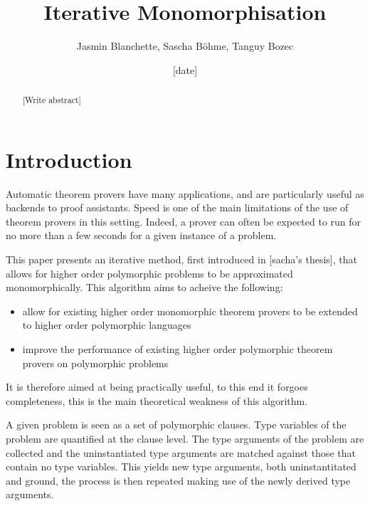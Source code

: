 \documentclass{article}
\begin{document}
\title{Iterative Monomorphisation}
\author{Jasmin Blanchette, Sascha B\"ohme, Tanguy Bozec}
\date{[date]}
\maketitle
\begin{abstract}
   [Write abstract]
\end{abstract}


\section{Introduction}
Automatic theorem provers have many applications, and are particularly useful as backends to proof assistants. Speed is one of the main limitations of the use of theorem provers in this setting. Indeed, a prover can often be expected to run for no more than a few seconds for a given instance of a problem.

This paper presents an iterative method, first introduced in [sacha's thesis], that allows for higher order polymorphic problems to be approximated monomorphically. This algorithm aims to acheive the following:
   \begin{itemize}
      \item allow for existing higher order monomorphic theorem provers to be extended to higher order polymorphic languages
      \item improve the performance of existing higher order polymorphic theorem provers on polymorphic problems
   \end{itemize}

It is therefore aimed at being practically useful, to this end it forgoes completeness, this is the main theoretical weakness of this algorithm.


A given problem is seen as a set of polymorphic clauses. Type variables of the problem are quantified at the clause level. The type arguments of the problem are collected and the uninstantiated type arguments are matched against those that contain no type variables. This yields new type arguments, both uninstantitated and ground, the process is then repeated making use of the newly derived type arguments.
\end{document}
